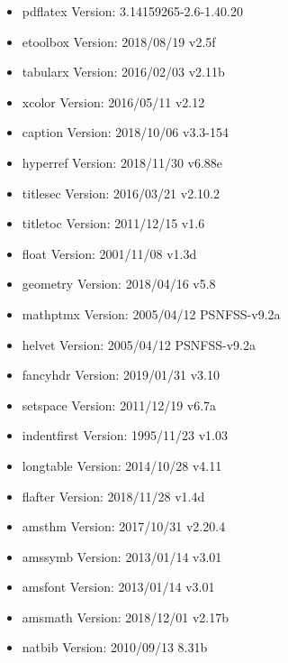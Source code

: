 \documentclass{article}
\begin{document}
    \begin{itemize}
        \item pdflatex      Version: 3.14159265-2.6-1.40.20
        \item etoolbox      Version: 2018/08/19 v2.5f
        \item tabularx      Version: 2016/02/03 v2.11b 
        \item xcolor        Version: 2016/05/11 v2.12
        \item caption       Version: 2018/10/06 v3.3-154
        \item hyperref      Version: 2018/11/30 v6.88e
        \item titlesec      Version: 2016/03/21 v2.10.2
        \item titletoc      Version: 2011/12/15 v1.6
        \item float         Version: 2001/11/08 v1.3d
        \item geometry      Version: 2018/04/16 v5.8
        \item mathptmx      Version: 2005/04/12 PSNFSS-v9.2a
        \item helvet        Version: 2005/04/12 PSNFSS-v9.2a
        \item fancyhdr      Version: 2019/01/31 v3.10
        \item setspace      Version: 2011/12/19 v6.7a
        \item indentfirst   Version: 1995/11/23 v1.03
        \item longtable     Version: 2014/10/28 v4.11
        \item flafter       Version: 2018/11/28 v1.4d
        \item amsthm        Version: 2017/10/31 v2.20.4
        \item amssymb       Version: 2013/01/14 v3.01
        \item amsfont       Version: 2013/01/14 v3.01
        \item amsmath       Version: 2018/12/01 v2.17b
        \item natbib        Version: 2010/09/13 8.31b
    \end{itemize}
\end{document}
